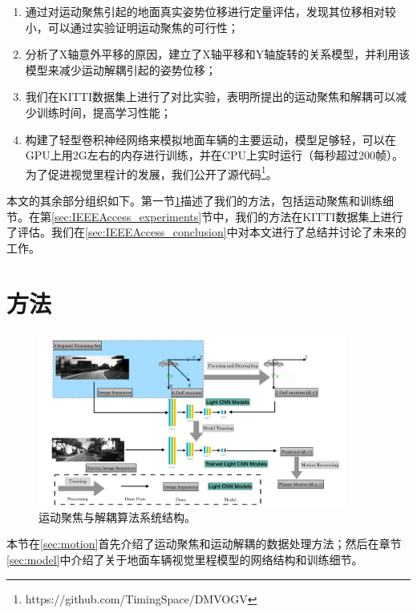 \begin{enumerate}
    \item {通过对运动聚焦引起的地面真实姿势位移进行定量评估，发现其位移相对较小，可以通过实验证明运动聚焦的可行性；}
    \item {分析了X轴意外平移的原因，建立了X轴平移和Y轴旋转的关系模型，并利用该模型来减少运动解耦引起的姿势位移；}
    \item {我们在KITTI数据集上进行了对比实验，表明所提出的运动聚焦和解耦可以减少训练时间，提高学习性能；}
    \item {构建了轻型卷积神经网络来模拟地面车辆的主要运动，模型足够轻，可以在GPU上用2G左右的内存进行训练，并在CPU上实时运行（每秒超过200帧）。
    为了促进视觉里程计的发展，我们公开了源代码\footnote{https://github.com/TimingSpace/DMVOGV}。}
\end{enumerate}

本文的其余部分组织如下。第一节\ref{sec:IEEEAccess_approach}描述了我们的方法，包括运动聚焦和训练细节。在第\ref{sec:IEEEAccess_experiments}节中，我们的方法在KITTI数据集\cite{geiger2012kitti}上进行了评估。我们在\ref{sec:IEEEAccess_conclusion}中对本文进行了总结并讨论了未来的工作。
\section{方法}
\label{sec:IEEEAccess_approach}

\begin{figure}[t]
    \centering
    \includegraphics[width=0.9\textwidth]{datavo/system_structure.pdf}
    \caption{运动聚焦与解耦算法系统结构。}
    \label{fig:system_structure}
\end{figure}
本节在\ref{sec:motion}首先介绍了运动聚焦和运动解耦的数据处理方法；然后在章节\ref{sec:model}中介绍了关于地面车辆视觉里程模型的网络结构和训练细节。


